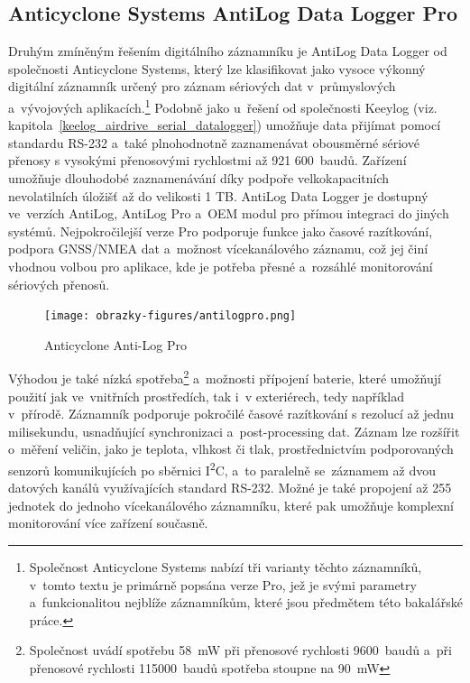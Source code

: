 \subsection{Anticyclone Systems AntiLog Data Logger Pro}
\label{anticyclone_systems_antilog_data_logger}
Druhým zmíněným řešením digitálního záznamníku je AntiLog Data Logger od společnosti Anticyclone Systems, který lze klasifikovat jako vysoce výkonný digitální záznamník určený pro záznam sériových dat v~průmyslových a~vývojových aplikacích.\footnote{Společnost Anticyclone Systems nabízí tři varianty těchto záznamníků, v~tomto textu je primárně popsána verze Pro, jež je svými parametry a~funkcionalitou nejblíže záznamníkům, které jsou předmětem této bakalářské práce.} Podobně jako u~řešení od společnosti Keeylog (viz. kapitola~\ref{keelog_airdrive_serial_datalogger}) umožňuje data přijímat pomocí standardu RS-232 a~také plnohodnotně zaznamenávat obousměrné sériové přenosy s vysokými přenosovými rychlostmi až 921 600~baudů. Zařízení umožňuje dlouhodobé zaznamenávání díky podpoře velkokapacitních nevolatilních úložišť až do velikosti 1 TB. AntiLog Data Logger je dostupný ve~verzích AntiLog, AntiLog Pro a~OEM modul pro přímou integraci do jiných systémů. Nejpokročilejší verze Pro podporuje funkce jako časové razítkování, podpora GNSS/NMEA dat a~možnost vícekanálového záznamu, což jej činí vhodnou volbou pro aplikace, kde je potřeba přesné a~rozsáhlé monitorování sériových přenosů.~\cite{anticyclone_systems_antilog_pro}

\begin{figure}[h]
    \centering
    \texttt{[image: obrazky-figures/antilogpro.png]}
    
    \caption{Anticyclone Anti-Log Pro~\cite{anticyclone_systems_antilog_pro_price}}
    \label{fig:antilog-pro}
\end{figure}

Výhodou je také nízká spotřeba\footnote{Společnost uvádí spotřebu \SI{58}{\milli\watt} při přenosové rychlosti 9600~baudů a~při přenosové rychlosti 115000~baudů spotřeba stoupne na \SI{90}{\milli\watt}} a~možnosti přípojení baterie, které umožňují použití jak ve~vnitřních prostředích, tak i~v exteriérech, tedy například v~přírodě. Záznamník podporuje pokročilé časové razítkování s rezolucí až jednu milisekundu, usnadňující synchronizaci a~post-processing dat. Záznam lze rozšířit o~měření veličin, jako je teplota, vlhkost či tlak, prostřednictvím podporovaných senzorů komunikujících po sběrnici I\textsuperscript{2}C, a~to paralelně se~záznamem až dvou datových kanálů využívajících standard RS-232. Možné je také propojení až 255 jednotek do jednoho vícekanálového záznamníku, které pak umožňuje komplexní monitorování více zařízení současně.~\cite{anticyclone_systems_antilog_pro, anticyclone_systems_antilog_pro_extended_logging}


